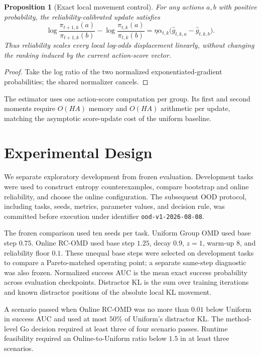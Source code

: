 \documentclass[10pt]{article}
\newtheorem{proposition}{Proposition}
\begin{document}
\begin{proposition}[Exact local movement control]
For any actions $a,b$ with positive probability, the reliability-calibrated
update satisfies
\begin{equation}
\log\frac{\pi_{t+1,k}(a)}{\pi_{t+1,k}(b)}
-\log\frac{\pi_{t,k}(a)}{\pi_{t,k}(b)}
=\eta\alpha_{t,k}
\bigl(\widehat g_{t,k,a}-\widehat g_{t,k,b}\bigr).
\end{equation}
Thus reliability scales every local log-odds displacement linearly, without
changing the ranking induced by the current action-score vector.
\end{proposition}

\begin{proof}
Take the log ratio of the two normalized exponentiated-gradient probabilities;
the shared normalizer cancels.
\end{proof}

The estimator uses one action-score computation per group.  Its first and second
moments require $O(HA)$ memory and $O(HA)$ arithmetic per update, matching the
asymptotic score-update cost of the uniform baseline.

\section{Experimental Design}

We separate exploratory development from frozen evaluation.  Development tasks
were used to construct entropy counterexamples, compare bootstrap and online
reliability, and choose the online configuration.  The subsequent OOD protocol,
including tasks, seeds, metrics, parameter values, and decision rule, was
committed before execution under identifier \texttt{ood-v1-2026-08-08}.

The frozen comparison used ten seeds per task.  Uniform Group OMD used base step
$0.75$.  Online RC-OMD used base step $1.25$, decay $0.9$, $z=1$, warm-up $8$,
and reliability floor $0.1$.  These unequal base steps were selected on
development tasks to compare a Pareto-matched operating point; a separate
same-step diagnostic was also frozen.  Normalized success AUC is the mean exact
success probability across evaluation checkpoints.  Distractor KL is the sum
over training iterations and known distractor positions of the absolute local
KL movement.

A scenario passed when Online RC-OMD was no more than $0.01$ below Uniform in
success AUC and used at most $50\%$ of Uniform's distractor KL.  The method-level
Go decision required at least three of four scenario passes.  Runtime feasibility
required an Online-to-Uniform ratio below $1.5$ in at least three scenarios.
\end{document}
